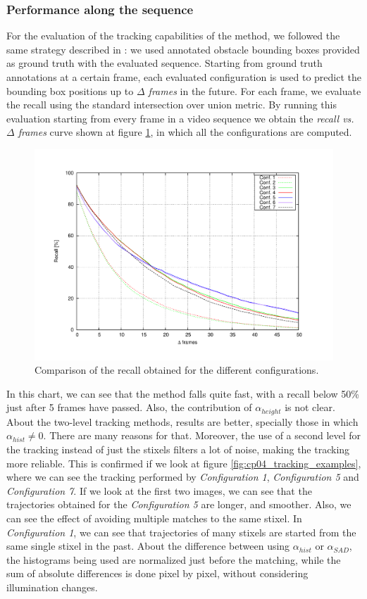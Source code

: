 \subsubsection{Performance along the sequence}\label{ch:chapter04_02_03_01}

For the evaluation of the tracking capabilities of the method, we followed the same strategy described in \cite{gunyel2012stixels}: we used annotated obstacle bounding boxes provided as ground truth with the evaluated sequence. Starting from ground truth annotations at a certain frame, each evaluated configuration is used to predict the bounding box positions up to \emph{$\Delta$ frames} in the future. For each frame, we evaluate the recall using the standard intersection over union metric. By running this evaluation starting from every frame in a video sequence we obtain the \emph{recall vs. $\Delta$ frames} curve shown at figure \ref{fig:cp04_recall_vs_delta_frames}, in which all the configurations are computed. 

\begin{figure}[h!]
\centering
\includegraphics[width=\textwidth,height=0.5\textwidth,trim=50 40 80 60,clip]{recall_vs_delta_frames}
\caption{Comparison of the recall obtained for the different configurations.}\label{fig:cp04_recall_vs_delta_frames}
\end{figure}

In this chart, we can see that the \cite{gunyel2012stixels} method falls quite fast, with a recall below 50\% just after 5 frames have passed. Also, the contribution of $\alpha_{height}$ is not clear. About the two-level tracking methods, results are better, specially those in which $\alpha_{hist} \neq 0$. There are many reasons for that. Moreover, the use of a second level for the tracking instead of just the stixels filters a lot of noise, making the tracking more reliable. This is confirmed if we look at figure \ref{fig:cp04_tracking_examples}, where we can see the tracking performed by \emph{Configuration 1}, \emph{Configuration 5} and \emph{Configuration 7}. If we look at the first two images, we can see that the trajectories obtained for the \emph{Configuration 5} are longer, and smoother. Also, we can see the effect of avoiding multiple matches to the same stixel. In \emph{Configuration 1}, we can see that trajectories of many stixels are started from the same single stixel in the past. About the difference between using $\alpha_{hist}$ or $\alpha_{SAD}$, the histograms being used are normalized just before the matching, while the sum of absolute differences is done pixel by pixel, without considering illumination changes.

